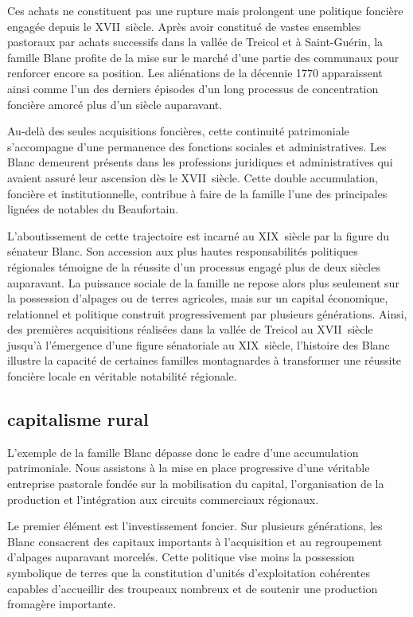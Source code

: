 \documentclass[12pt,a4paper]{report}
\begin{document}
	Ces achats ne constituent pas une rupture mais prolongent une politique foncière engagée depuis le XVII\ieme\ siècle. Après avoir constitué de vastes ensembles pastoraux par achats successifs dans la vallée de Treicol et à Saint-Guérin, la famille Blanc profite de la mise sur le marché d'une partie des communaux pour renforcer encore sa position. Les aliénations de la décennie 1770 apparaissent ainsi comme l'un des derniers épisodes d'un long processus de concentration foncière amorcé plus d'un siècle auparavant.
	
	Au-delà des seules acquisitions foncières, cette continuité patrimoniale s'accompagne d'une permanence des fonctions sociales et administratives. Les Blanc demeurent présents dans les professions juridiques et administratives qui avaient assuré leur ascension dès le XVII\ieme\ siècle. Cette double accumulation, foncière et institutionnelle, contribue à faire de la famille l'une des principales lignées de notables du Beaufortain.
	
	L'aboutissement de cette trajectoire est incarné au XIX\ieme\ siècle par la figure du sénateur Blanc. Son accession aux plus hautes responsabilités politiques régionales témoigne de la réussite d'un processus engagé plus de deux siècles auparavant. La puissance sociale de la famille ne repose alors plus seulement sur la possession d'alpages ou de terres agricoles, mais sur un capital économique, relationnel et politique construit progressivement par plusieurs générations. Ainsi, des premières acquisitions réalisées dans la vallée de Treicol au XVII\ieme\ siècle jusqu'à l'émergence d'une figure sénatoriale au XIX\ieme\ siècle, l'histoire des Blanc illustre la capacité de certaines familles montagnardes à transformer une réussite foncière locale en véritable notabilité régionale.
	
	\subsection{capitalisme rural}
	
	L'exemple de la famille Blanc dépasse donc le cadre d'une  accumulation patrimoniale. Nous assistons à la mise en place progressive d'une véritable entreprise pastorale fondée sur la mobilisation du capital, l'organisation de la production et l'intégration aux circuits commerciaux régionaux.
	
	Le premier élément est l'investissement foncier. Sur plusieurs générations, les Blanc consacrent des capitaux importants à l'acquisition et au regroupement d'alpages auparavant morcelés. Cette politique vise moins la possession symbolique de terres que la constitution d'unités d'exploitation cohérentes capables d'accueillir des troupeaux nombreux et de soutenir une production fromagère importante.
	
\end{document}
